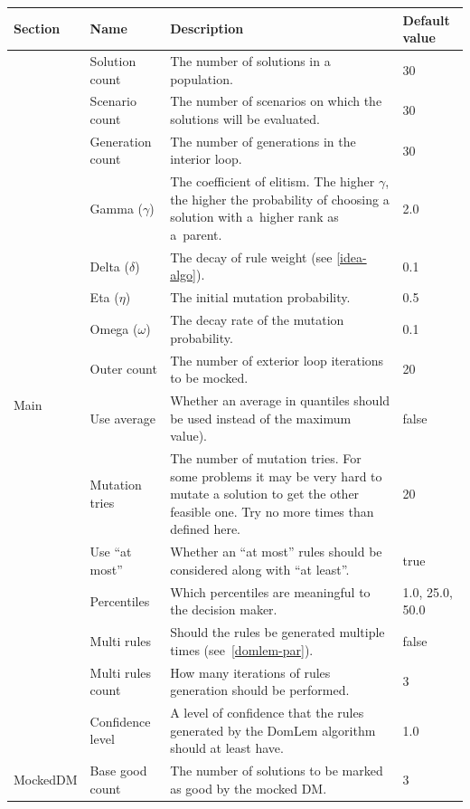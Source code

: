 \begin{table}
  \centering
  \begin{tabular}{l l p{7cm} l}
    \hline
    Section &  Name & Description & Default value \\
    \hline
    \hline
    \multirow{15}{*}{Main} & 
    Solution count & The number of solutions in a population. & 30 \\
    & Scenario count & The number of scenarios on which the solutions will be evaluated.  & 30 \\
    & Generation count & The number of generations in the interior loop. & 30 \\
    & Gamma ($\gamma$) & The coefficient of elitism. The higher $\gamma$, the
    higher the probability of choosing a solution with a~higher rank as
    a~parent. & 2.0  \\
    & Delta ($\delta$) & The decay of rule weight (see \ref{idea-algo}). & 0.1  \\
    & Eta ($\eta$) & The initial mutation probability.  & 0.5    \\
    & Omega ($\omega$)& The decay rate of the mutation probability. & 0.1  \\
    & Outer count & The number of exterior loop iterations to be mocked. & 20 \\
    & Use average & Whether an average in quantiles should be used instead of
    the maximum value). & false  \\
    & Mutation tries & The number of mutation tries. For some problems it may be
    very hard to mutate a solution to get the other feasible one. Try no more
    times than defined here.  & 20  \\
    & Use ``at most'' & Whether an ``at most'' rules should be considered
    along with ``at least''. & true \\
    & Percentiles & Which percentiles are meaningful to the decision maker. & 1.0, 25.0, 50.0  \\
    & Multi rules & Should the rules be generated multiple times (see~\ref{domlem-par}). & false \\
    & Multi rules count & How many iterations of rules generation should be performed. & 3 \\
    \hline
    DomLem & Confidence level & A level of confidence that the rules generated by the
    DomLem algorithm should at least have. & 1.0 \\
    \hline
    \multirow{3}{*}{MockedDM} & Base good count & The number of solutions to be marked
    as good by the mocked DM. & 3 \\

\end{tabular}
\end{table}
